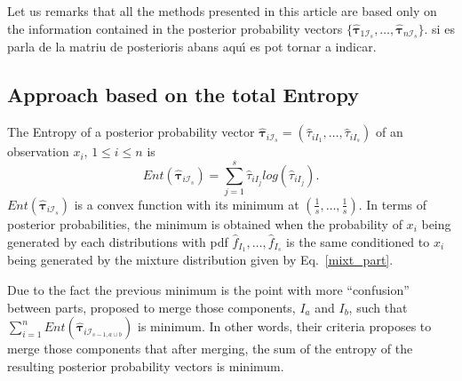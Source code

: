 \documentclass[10pt, a4paper]{article}
\newcommand{\m}[1]{\boldsymbol{#1}}
\begin{document}
Let us remarks that all the methods presented in this article are based only on the information contained in the posterior probability vectors $\{ \hat{\m\tau}_{1 \mathcal{I}_s},\dots, \hat{\m\tau}_{n \mathcal{I}_s} \}$. {\color{blue} si es parla de la matriu de posterioris abans aqu\'{\i} es pot tornar a indicar.}


\subsection{Approach based on the total Entropy}

The Entropy of a posterior probability vector $\hat{\m\tau}_{i \mathcal{I}_s} = \left( \hat{\tau}_{i I_1} , \dots, \hat{\tau}_{i I_s}  \right)$ of an observation $x_i$, $1 \leq i \leq n$ is
\[
Ent( \hat{\m \tau}_{i \mathcal{I}_s} ) = \sum_{j=1}^s \hat{\tau}_{i I_j}  log(\hat{\tau}_{i I_j} ).
\]
$Ent( \hat{\m \tau}_{i \mathcal{I}_s} )$ is a convex function with its minimum at $(\frac{1}{s},\dots,\frac{1}{s})$. In terms of posterior probabilities, the minimum is obtained when the probability of $x_i$ being generated by each distributions with pdf $\hat{f}_{I_1}, \dots, \hat{f}_{I_s}$ is the same conditioned to $x_i$ being generated by the mixture distribution given by Eq.~\ref{mixt_part}.

Due to the fact the previous minimum is the point with more ``confusion'' between parts, \cite{baudry2010combining} proposed to merge those components, $I_a$ and $I_b$, such that $\sum_{i=1}^n Ent( \hat{\m \tau}_{i \mathcal{I}_{s-1, a \cup b}} )$ is minimum. In other words, their criteria proposes to merge those components that after merging, the sum of the entropy of the resulting posterior probability vectors is minimum.
\end{document}
